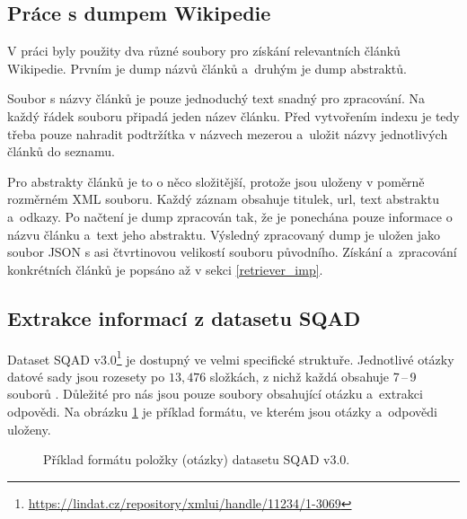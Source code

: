 \subsection{Práce s dumpem Wikipedie}
V práci byly použity dva různé soubory pro získání relevantních článků Wikipedie. Prvním je dump názvů článků a~druhým je dump abstraktů.\par
Soubor s názvy článků je pouze jednoduchý text snadný pro zpracování. Na každý řádek souboru připadá jeden název článku. Před vytvořením indexu je tedy třeba pouze nahradit podtržítka v názvech mezerou a~uložit názvy jednotlivých článků do seznamu.\par
Pro abstrakty článků je to o něco složitější, protože jsou uloženy v poměrně rozměrném XML souboru. Každý záznam obsahuje titulek, url, text abstraktu a~odkazy. Po načtení je dump zpracován tak, že je ponechána pouze informace o názvu článku a~text jeho abstraktu. Výsledný zpracovaný dump je uložen jako soubor JSON s asi čtvrtinovou velikostí souboru původního. Získání a~zpracování konkrétních článků je popsáno až v sekci \ref{retriever_imp}.

\subsection{Extrakce informací z datasetu SQAD}
Dataset SQAD v3.0\footnote{\url{https://lindat.cz/repository/xmlui/handle/11234/1-3069}} je dostupný ve velmi specifické struktuře. Jednotlivé otázky datové sady jsou rozesety po $13,476$ složkách, z nichž každá obsahuje 7\,--\,9 souborů . Důležité pro nás jsou pouze soubory obsahující otázku a~extrakci odpovědi. Na obrázku \ref{question_format} je příklad formátu, ve kterém jsou otázky a~odpovědi uloženy. 

\begin{figure}[hbt]
	\centering
	\caption{Příklad formátu položky (otázky) datasetu SQAD v3.0.}
	\label{question_format}
\end{figure}

